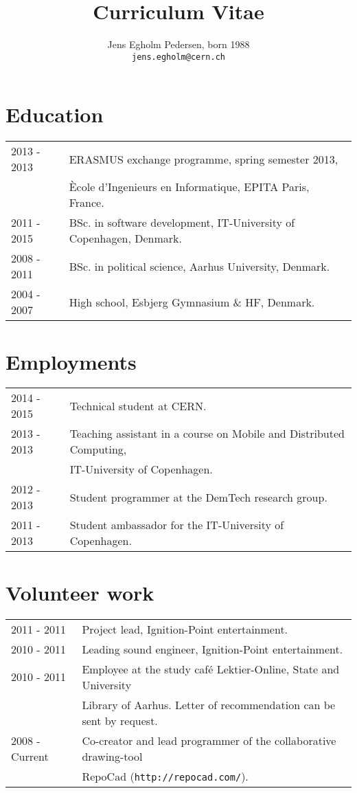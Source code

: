 \documentclass[12pt,a4paper,notitlepage]{article}
\author{Jens Egholm Pedersen, born 1988 
\\ \texttt{jens.egholm@cern.ch}
}
\title{Curriculum Vitae}
\begin{document}
\maketitle
\section*{Education}
\begin{tabular}{l l }
2013 - 2013 & ERASMUS exchange programme, spring semester 2013, \\
            & Ècole d'Ingenieurs en Informatique, EPITA Paris, France. \\
2011 - 2015 & BSc. in software development, IT-University of Copenhagen, Denmark. \\
2008 - 2011 & BSc. in political science, Aarhus University, Denmark. \\
2004 - 2007 & High school, Esbjerg Gymnasium \& HF, Denmark.
\end{tabular}

\section*{Employments}
\begin{tabular}{l l }
2014 - 2015 & Technical student at CERN. \\
2013 - 2013 & Teaching assistant in a course on Mobile and Distributed Computing, \\
            & IT-University of Copenhagen. \\
2012 - 2013 & Student programmer at the DemTech research group. \\
2011 - 2013 & Student ambassador for the IT-University of Copenhagen.
\end{tabular}

\section*{Volunteer work}
\begin{tabular}{l l }
2011 - 2011 & Project lead, Ignition-Point entertainment. \\
2010 - 2011 & Leading sound engineer, Ignition-Point entertainment. \\
2010 - 2011 & Employee at the study café Lektier-Online, State and University \\ & Library of Aarhus. Letter of recommendation can be sent by request. \\
2008 - Current & Co-creator and lead programmer of the collaborative drawing-tool \\
               & RepoCad (\texttt{http://repocad.com/}).
\end{tabular}
\end{document}
